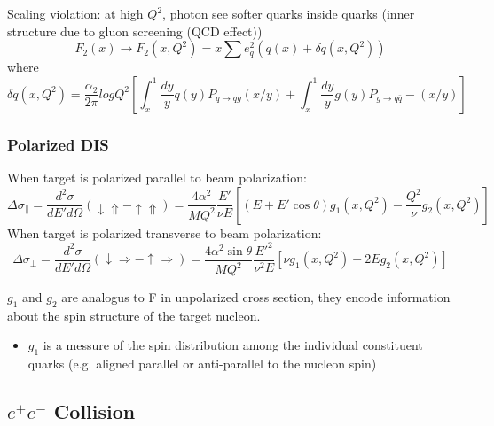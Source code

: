 Scaling violation: at high $Q^2$, photon see softer quarks inside quarks (inner
structure due to gluon screening (QCD effect))
$$ F_2(x) \rightarrow F_2(x, Q^2) = x\sum e_q^2(q(x) + \delta q(x, Q^2))$$
where
$$ \delta q(x, Q^2) = \frac{\alpha_2}{2\pi}log Q^2
    \left[ \int_x^1 \frac{dy}{y}q(y)P_{q\rightarrow qg}(x/y) +
    \int_x^1\frac{dy}{y}g(y)P_{g\rightarrow q\bar{q}} -(x/y) \right]$$
\subsubsection{Polarized DIS}
When target is polarized parallel to beam polarization:
\begin{equation*}
    \Delta\sigma_\parallel = \frac{d^2\sigma}{dE'd\Omega}(\downarrow\Uparrow - \uparrow\Uparrow)
     = \frac{4\alpha^2}{MQ^2}\frac{E'}{\nu E} 
     \left[ (E + E'\cos\theta)g_1(x, Q^2) - \frac{Q^2}{\nu}g_2(x, Q^2) \right]
\end{equation*}
When target is polarized transverse to beam polarization:
\begin{equation*}
    \Delta\sigma_\perp = \frac{d^2\sigma}{dE'd\Omega}(\downarrow\Rightarrow - \uparrow\Rightarrow)
     = \frac{4\alpha^2\sin\theta}{MQ^2}\frac{E'^2}{\nu^2 E} 
     \left[ \nu g_1(x, Q^2) - 2E g_2(x, Q^2) \right]
\end{equation*}

$g_1$ and $g_2$ are analogus to F in unpolarized cross section, they encode 
information about the spin structure of the target nucleon.
\begin{itemize}
    \item $g_1$ is a messure of the spin distribution among the individual 
	constituent quarks (e.g. aligned parallel or anti-parallel to the 
	nucleon spin)
\end{itemize}


\subsection{$e^+e^-$ Collision}

